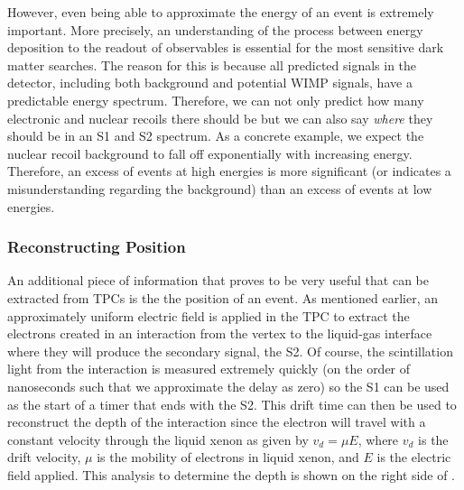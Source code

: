 However, even being able to approximate the energy of an event is extremely important.  More precisely, an understanding of the process between energy deposition to the readout of observables is essential for the most sensitive dark matter searches.  The reason for this is because all predicted signals in the detector, including both background and potential WIMP signals, have a predictable energy spectrum.  Therefore, we can not only predict how many electronic and nuclear recoils there should be but we can also say \textit{where} they should be in an S1 and S2 spectrum.  As a concrete example, we expect the nuclear recoil background to fall off exponentially with increasing energy.  Therefore, an excess of events at high energies is more significant (or indicates a misunderstanding regarding the background) than an excess of events at low energies.


\subsubsection{Reconstructing Position}
\label{sec:xe_pos_rec}

An additional piece of information that proves to be very useful that can be extracted from TPCs is the the position of an event.  As mentioned earlier, an approximately uniform electric field is applied in the TPC to extract the electrons created in an interaction from the vertex to the liquid-gas interface where they will produce the secondary signal, the S2.  Of course, the scintillation light from the interaction is measured extremely quickly (on the order of nanoseconds such that we approximate the delay as zero) so the S1 can be used as the start of a timer that ends with the S2.  This drift time can then be used to reconstruct the depth of the interaction since the electron will travel with a constant velocity through the liquid xenon as given by $v_d = \mu E$, where $v_d$ is the drift velocity, $\mu$ is the mobility of electrons in liquid xenon, and $E$ is the electric field applied.   This analysis to determine the depth is shown on the right side of .

